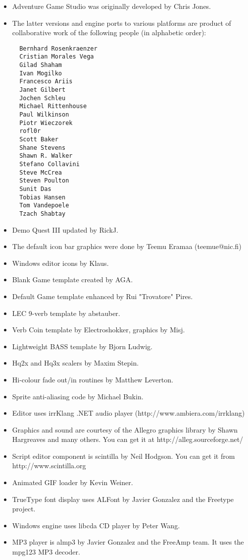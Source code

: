 \begin{itemize}
\item Adventure Game Studio was originally developed by Chris Jones.
\item The latter versions and engine ports to various platforms are product of
collaborative work of the following people (in alphabetic order):
\begin{verbatim}
  Bernhard Rosenkraenzer
  Cristian Morales Vega
  Gilad Shaham
  Ivan Mogilko
  Francesco Ariis
  Janet Gilbert
  Jochen Schleu
  Michael Rittenhouse
  Paul Wilkinson
  Piotr Wieczorek
  rofl0r
  Scott Baker
  Shane Stevens
  Shawn R. Walker
  Stefano Collavini
  Steve McCrea
  Steven Poulton
  Sunit Das
  Tobias Hansen
  Tom Vandepoele
  Tzach Shabtay
\end{verbatim}
\item Demo Quest III updated by RickJ.
\item The default icon bar graphics were done by Teemu Eramaa (teemue@nic.fi)
\item Windows editor icons by Klaus.
\item Blank Game template created by AGA.
\item Default Game template enhanced by Rui "Trovatore" Pires.
\item LEC 9-verb template by abstauber.
\item Verb Coin template by Electroshokker, graphics by Misj.
\item Lightweight BASS template by Bjorn Ludwig.
\item Hq2x and Hq3x scalers by Maxim Stepin.
\item Hi-colour fade out/in routines by Matthew Leverton.
\item Sprite anti-aliasing code by Michael Bukin.
\item Editor uses irrKlang .NET audio player (http://www.ambiera.com/irrklang)
\item Graphics and sound are courtesy of the Allegro graphics library by Shawn
  Hargreaves and many others. You can get it at
  http://alleg.sourceforge.net/
\item Script editor component is scintilla by Neil Hodgson. You can get it from http://www.scintilla.org
\item Animated GIF loader by Kevin Weiner.
\item TrueType font display uses ALFont by Javier Gonzalez and the Freetype project.
\item Windows engine uses libcda CD player by Peter Wang.
\item MP3 player is almp3 by Javier Gonzalez and the FreeAmp team. It uses the mpg123 MP3 decoder.

\end{itemize}
